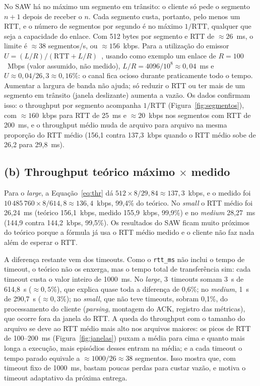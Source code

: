 \documentclass[11pt,a4paper]{article}
\begin{document}
No SAW há no máximo um segmento em trânsito: o cliente só pede o segmento $n+1$ depois
de receber o $n$. Cada segmento custa, portanto, pelo menos um RTT, e o número de
segmentos por segundo é no máximo $1/\text{RTT}$, qualquer que seja a capacidade do
enlace. Com 512 bytes por segmento e RTT de $\approx 26$~ms, o limite é
$\approx 38$ segmentos/s, ou $\approx 156$~kbps. Para a utilização do emissor
$U = (L/R)/(\text{RTT} + L/R)$~\cite{kurose}, usando como exemplo um enlace de
$R=100$~Mbps (valor assumido, não medido), $L/R = 4096/10^8 \approx 0{,}04$~ms e
$U \approx 0{,}04/26{,}3 \approx 0{,}16\%$: o canal fica ocioso durante praticamente todo o
tempo. Aumentar a largura de banda não ajuda; só reduzir o RTT ou ter mais de um segmento em
trânsito (janela deslizante) aumenta a vazão. Os dados confirmam isso: o throughput por
segmento acompanha $1/\text{RTT}$ (Figura~\ref{fig:segmentos}), com $\approx 160$~kbps para RTT
de 25~ms e $\approx 20$~kbps nos segmentos com RTT de 200~ms, e o throughput médio muda de
arquivo para arquivo na mesma proporção do RTT médio (156,1 contra 137,3~kbps quando o RTT médio sobe de
26,2 para 29,8~ms).

\subsection*{(b) Throughput teórico máximo $\times$ medido}

Para o \textit{large}, a Equação~\ref{eq:thr} dá
$512 \times 8 / 29{,}84 \approx 137{,}3$~kbps, e o medido foi
$10\,485\,760 \times 8 / 614{,}8 \approx 136{,}4$~kbps, 99,4\% do teórico. No \textit{small}
o RTT médio foi 26,24~ms (teórico 156,1~kbps, medido 155,9~kbps, 99,9\%) e no \textit{medium}
28,27~ms (144,9 contra 144,2~kbps, 99,5\%). Os resultados do SAW ficam muito próximos do teórico porque a fórmula já
usa o RTT médio medido e o cliente não faz nada além de esperar o RTT.

A diferença restante vem dos timeouts. Como o \texttt{rtt\_ms} não inclui o tempo de timeout, o
teórico não os enxerga, mas o tempo total de transferência sim: cada timeout custa o valor
inteiro de 1000~ms. No \textit{large}, 3~timeouts somam 3~s de 614,8~s ($\approx 0{,}5\%$),
que explica quase toda a diferença de 0,6\%; no \textit{medium}, 1~s de 290,7~s
($\approx 0{,}3\%$); no \textit{small}, que não teve timeouts, sobram 0,1\%, do
processamento do cliente (\textit{parsing}, montagem do ACK, registro das métricas), que ocorre fora da janela do RTT. A queda do
throughput com o tamanho do arquivo se deve ao RTT médio mais alto nos arquivos maiores: os picos de RTT
de 100--200~ms (Figura~\ref{fig:janelas}) puxam a média para cima e quanto mais longa a
execução, mais episódios desses entram na média; e a cada
timeout o tempo parado equivale a $\approx 1000/26 \approx 38$ segmentos. Isso
mostra que, com timeout fixo de 1000~ms, bastam poucas perdas para custar vazão, e
motiva o timeout adaptativo da próxima entrega.
\end{document}
